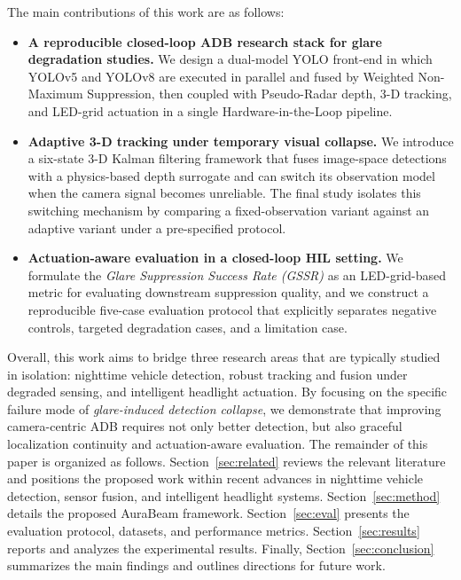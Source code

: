 \documentclass[pdflatex,sn-mathphys-num]{sn-jnl}%
\theoremstyle{thmstyleone}%
\theoremstyle{thmstyletwo}%
\theoremstyle{thmstylethree}%
\begin{document}
The main contributions of this work are as follows:
\begin{itemize}
    \item \textbf{A reproducible closed-loop ADB research stack for glare degradation studies.}
    We design a dual-model YOLO front-end in which YOLOv5 and YOLOv8 are executed in parallel and fused by Weighted Non-Maximum Suppression, then coupled with Pseudo-Radar depth, 3-D tracking, and LED-grid actuation in a single Hardware-in-the-Loop pipeline.

    \item \textbf{Adaptive 3-D tracking under temporary visual collapse.}
    We introduce a six-state 3-D Kalman filtering framework that fuses image-space detections with a physics-based depth surrogate and can switch its observation model when the camera signal becomes unreliable. The final study isolates this switching mechanism by comparing a fixed-observation variant against an adaptive variant under a pre-specified protocol.

    \item \textbf{Actuation-aware evaluation in a closed-loop HIL setting.}
    We formulate the \emph{Glare Suppression Success Rate (GSSR)} as an LED-grid-based metric for evaluating downstream suppression quality, and we construct a reproducible five-case evaluation protocol that explicitly separates negative controls, targeted degradation cases, and a limitation case.
\end{itemize}

Overall, this work aims to bridge three research areas that are typically studied in isolation: nighttime vehicle detection, robust tracking and fusion under degraded sensing, and intelligent headlight actuation. By
focusing on the specific failure mode of \emph{glare-induced detection collapse}, we demonstrate that improving camera-centric ADB requires not only better detection, but also graceful localization continuity and actuation-aware evaluation.
The remainder of this paper is organized as follows.
Section~\ref{sec:related} reviews the relevant literature and positions the proposed work within recent advances in nighttime vehicle detection, sensor fusion, and intelligent headlight systems.
Section~\ref{sec:method} details the proposed AuraBeam framework.
Section~\ref{sec:eval} presents the evaluation protocol, datasets, and performance metrics.
Section~\ref{sec:results} reports and analyzes the experimental results.
Finally, Section~\ref{sec:conclusion} summarizes the main findings and
outlines directions for future work.
\end{document}

